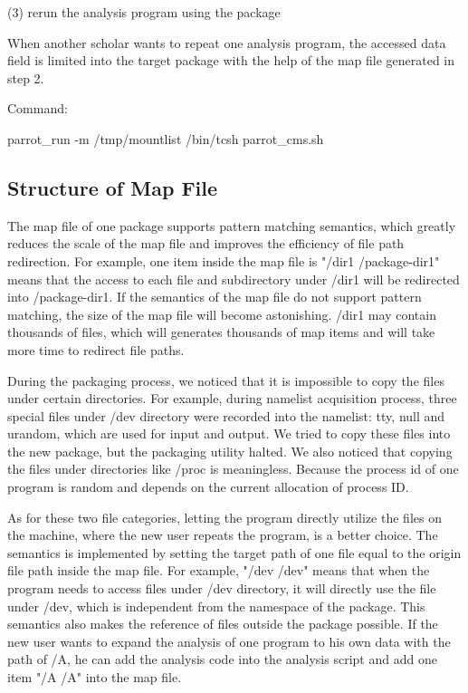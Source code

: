 \documentclass{acm_proc_article-sp}
\begin{document}
(3) rerun the analysis program using the package

When another scholar wants to repeat one analysis program, the accessed data
field is limited into the target package with the help of the map file 
generated in step 2. 

Command:

parrot\_run -m /tmp/mountlist /bin/tcsh parrot\_cms.sh

\subsection{Structure of Map File} 

The map file of one package supports pattern matching semantics,
which greatly reduces the scale of the map file and improves the efficiency of file path redirection. 
For example,
one item inside the map file is "/dir1 /package-dir1" means that the access to each file and
subdirectory under /dir1 will be redirected into /package-dir1.
If the semantics of the map file do not support pattern matching, the size of the map file will become astonishing. 
/dir1 may contain thousands of files, which will generates thousands of map items and will take more time to redirect file paths.

During the packaging process, we noticed
that it is impossible to copy the files under certain directories.
For example, during namelist acquisition process, three special files under /dev directory were recorded into the namelist: tty, null and urandom, which are used for input and output.
We tried to copy these files into the new package, but the packaging utility halted.
We also noticed that copying the files under directories like /proc is
meaningless. Because the process id of one program is random and depends on the
current allocation of process ID. 

As for these two file categories, letting
the program directly utilize the files on the machine, where the new user
repeats the program, is a better choice. The semantics is implemented by
setting the target path of one file equal to the origin file path inside the
map file. For example, "/dev /dev" means that when the program needs to access
files under /dev directory, it will directly use the file under /dev, which is
independent from the namespace of the package. This semantics also makes the
reference of files outside the package possible. If the new user wants to
expand the analysis of one program to his own data with the path of /A, he can add the analysis
code into the analysis script and add one item "/A /A" into the map file.
\end{document}
